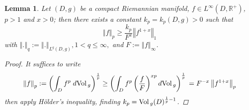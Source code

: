 \documentclass{article}
\newcommand{\func}[1]{\textnormal {#1\,}}
\newcommand{\R}{\mathbb{R}}
\newcommand{\vol}{\func{Vol}}
\newtheorem{lemma}[theorem]{Lemma}
\begin{document}
\begin{lemma}   \label{lemma p-norm and 1-norm}
Let $\left(D,g\right)$ be a compact Riemannian manifold, $f\in L^\infty\left(D,\R^+\right)$,  $p>1$ and $x>0$; then there exists a constant $k_p=k_p\left(D,g\right)>0$ such that
\begin{displaymath}
        \left\Vert f\right\Vert_p \geq \frac{k_p}{F^x}\left\Vert f^{1+x}         \right\Vert_1
\end{displaymath}
with $\left\Vert.\right\Vert_q:=\left\Vert . \right\Vert_{L^q\left(D,g\right)},1<q\leq\infty,$ and $F:= \left\Vert f \right\Vert_\infty$.
\begin{proof}
It suffices to write
\begin{displaymath}
        \left\Vert f \right\Vert_p := \left(\int_D f^p \; d\func{Vol}_g\right)^{\frac{1}{p}}
        \geq \left(\int_D f^p\left( \frac{f}{F} \right)^{xp}
        d\func{Vol}_g\right)^{\frac{1}{p}} \\
        = F^{-x} \left\Vert f^{1+x} \right\Vert_p
\end{displaymath}
then apply H\"older's inequality, finding $k_p=\vol_g(D)^{\frac{1}{p}-1}$.
\end{proof}
\end{lemma}
\end{document}
